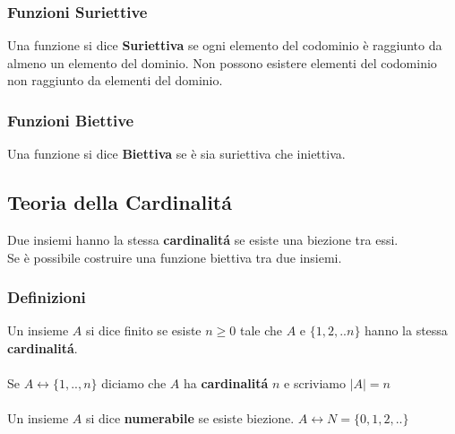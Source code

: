 \documentclass[11pt]{article}
\begin{document}
        \subsubsection{Funzioni Suriettive}
            Una funzione si dice \textbf{Suriettiva} se ogni elemento del codominio \`e raggiunto da almeno un elemento del dominio. Non possono esistere elementi del codominio non raggiunto da elementi del dominio.
        \subsubsection{Funzioni Biettive}
            Una funzione si dice \textbf{Biettiva} se \`e sia suriettiva che iniettiva.
    \subsection{Teoria della Cardinalit\'a}
        Due insiemi hanno la stessa \textbf{cardinalit\'a} se esiste una biezione tra essi.\\
        Se \`e possibile costruire una funzione biettiva tra due insiemi.
        \subsubsection{Definizioni}
            Un insieme $A$ si dice finito se esiste $n \geq 0$ tale che $A$ e $\{1,2,..n\}$ hanno la stessa \textbf{cardinalit\'a}.  \\
            \\
            Se $A \longleftrightarrow \{1,..,n\}$ diciamo che $A$ ha \textbf{cardinalit\'a} $n$ e scriviamo  
            $\mid A \mid  =  n $ 
            \\
            \\
            Un insieme $A$ si dice \textbf{numerabile} se esiste biezione. 
            $A \longleftrightarrow N = \{0,1,2,..\}$
\end{document}

